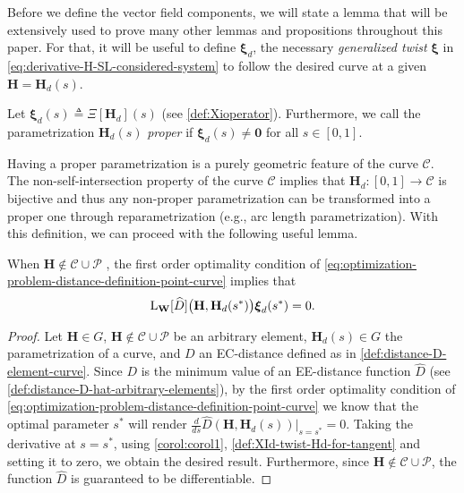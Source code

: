 Before we define the vector field components, we will state a lemma that will be extensively used to prove many other lemmas and propositions throughout this paper. For that, it will be useful to define $\boldsymbol{\xi}_d$, the necessary \emph{generalized twist} $\boldsymbol{\xi}$ in \eqref{eq:derivative-H-SL-considered-system} to follow the desired curve at a given $\mathbf{H}=\mathbf{H}_d(s)$.
\begin{definition} \label{def:XId-twist-Hd-for-tangent}
    Let $\boldsymbol{\xi}_d(s) \triangleq \Xi[\mathbf{H}_d](s)$ (see \cref{def:Xioperator}). Furthermore, we call the parametrization $\mathbf{H}_d(s)$ \emph{proper} if $\boldsymbol{\xi}_d(s) \neq \mathbf{0}$ for all $s \in [0,1]$.
\end{definition}
Having a proper parametrization is a purely geometric feature of the curve $\mathcal{C}$. The non-self-intersection property of the curve $\mathcal{C}$ implies that $\mathbf{H}_d: [0,1] \to \mathcal{C}$ is bijective and thus any non-proper parametrization can be transformed into a proper one through reparametrization (e.g., arc length parametrization). With this definition, we can proceed with the following useful lemma.
\begin{lemma}\label{lemma:optimization-problem-part-hdi-vanishers}
    When $\mathbf{H} \notin \mathcal{C} \cup \mathcal{P}$ , the first order optimality condition of \eqref{eq:optimization-problem-distance-definition-point-curve} implies that 
    \begin{equation}
    \textnormal{L}_{\mathbf{W}}[\widehat{D}]\bigl(\mathbf{H},\mathbf{H}_d(s^*)\bigr)\boldsymbol{\xi}_d(s^*) = 0.
    \end{equation}
\end{lemma}
\begin{proof}
    Let $\mathbf{H}\in G$, $\mathbf{H} \notin \mathcal{C} \cup \mathcal{P}$ be an arbitrary element, $\mathbf{H}_d(s)\in G$ the parametrization of a curve, and $D$ an EC-distance defined as in \cref{def:distance-D-element-curve}. Since $D$ is the minimum value of an EE-distance function $\widehat{D}$ (see \cref{def:distance-D-hat-arbitrary-elements}), by the first order optimality condition of \eqref{eq:optimization-problem-distance-definition-point-curve} we know that the optimal parameter $s^*$ will render $\frac{d}{ds}\widehat{D}(\mathbf{H}, \mathbf{H}_d(s))|_{s=s^*}=0$. Taking the derivative at $s=s^*$, using \cref{corol:corol1}, \cref{def:XId-twist-Hd-for-tangent} and setting it to zero, we obtain the desired result. Furthermore, since $\mathbf{H} \not\in \mathcal{C} \cup \mathcal{P}$, the function $\widehat{D}$ is guaranteed to be differentiable.  
\end{proof}
